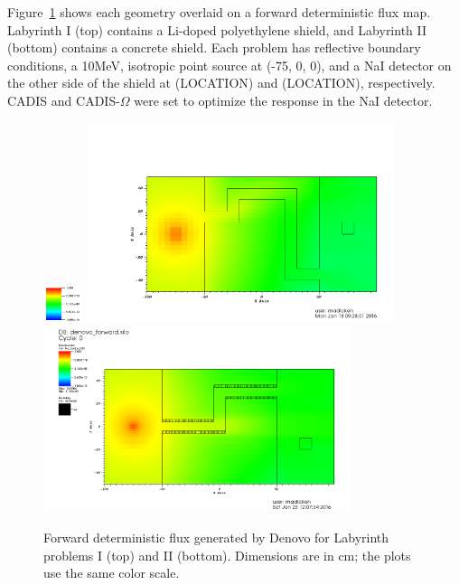 \documentclass[12pt]{article}
\begin{document}
Figure~\ref{fig::fwdflux} shows each geometry overlaid on a forward deterministic flux map. 
Labyrinth I (top) contains a Li-doped polyethylene shield, and Labyrinth II (bottom) contains a concrete shield. 
Each problem has reflective boundary conditions,
 a 10MeV, isotropic point source at (-75, 0, 0), and a NaI detector on the other side of the shield at (LOCATION) and (LOCATION), respectively. 
CADIS and CADIS-$\Omega$ were set to optimize the response in the NaI detector. 
\begin{figure}
  \begin{center}
    \includegraphics[width=0.10\textwidth]{./images/scale.png}
    \includegraphics[width=0.80\textwidth]{./images/forward_flux.png}
    \includegraphics[width=0.80\textwidth]{./images/maze2_forward_group00_adjusted.png}
    \caption[]{\label{fig::fwdflux}Forward deterministic flux generated by Denovo for Labyrinth problems I (top) and II (bottom). Dimensions are in cm; the plots use the same color scale.}
  \end{center}
\end{figure}
\end{document}
